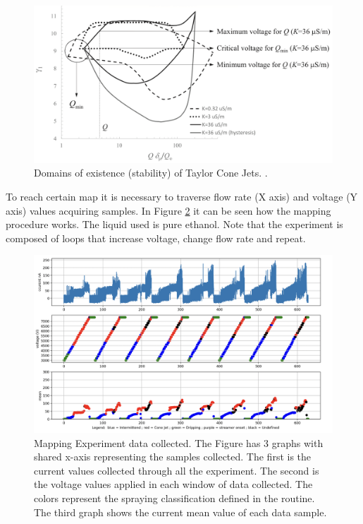 \begin{figure}[H]
    \center
    \includegraphics[width=13cm]{Figuras/ganan_calvo_map.png}
    \caption{Domains of existence (stability) of Taylor Cone Jets. \cite{gananCalvo} .}
    \label{fig:ganan_calvo_fig}
\end{figure}

    To reach certain map it is necessary to traverse flow rate (X axis) and voltage (Y axis) values acquiring samples.
    In Figure \ref{fig:map2Data_fig} it can be seen how the mapping procedure works. The liquid used is pure ethanol. 
    Note that the experiment is composed of loops that increase voltage, change flow rate and repeat.

    \begin{figure}[H]
        \center
        \includegraphics[width=16cm]{Figuras/report2/map2Data.png}
        \caption{Mapping Experiment data collected. The Figure has 3 graphs with shared x-axis representing the samples collected. The first is the current values collected through all the experiment.
        The second is the voltage values applied in each window of data collected. The colors represent the spraying classification defined in the routine.
        The third graph shows the current mean value of each data sample.}
        \label{fig:map2Data_fig}
    \end{figure}

